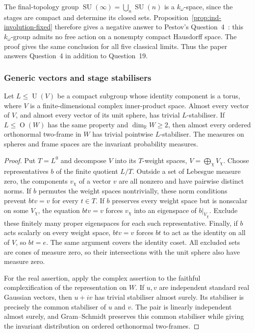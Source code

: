 \begin{remark}\label{rem:ind-pestov-question-four}
The final-topology group $\operatorname{SU}(\infty)=\bigcup_n\operatorname{SU}(n)$ is a
$k_\omega$-space, since the stages are compact and determine its closed
sets. Proposition~\ref{prop:ind-involution-fixed} therefore gives a negative
answer to Pestov's Question~4~\cite[p.~440]{Pestov2007}: this
$k_\omega$-group admits no free action on a nonempty compact Hausdorff
space. The proof gives the same conclusion for all five classical
limits. Thus the paper answers Question~4 in addition to Question~19.
\end{remark}


\subsubsection{Generic vectors and stage stabilisers}

\begin{lemma}\label{lem:ind-generic-free-vectors}
Let $L\le\operatorname{U}(V)$ be a compact subgroup whose identity component is
a torus, where $V$ is a finite-dimensional complex inner-product
space. Almost every vector of $V$, and almost every vector of its
unit sphere, has trivial $L$-stabiliser. If $L\le\operatorname{O}(W)$ has the
same property and $\dim_{\mathbb R}W\ge2$, then almost every ordered
orthonormal two-frame in $W$ has trivial pointwise $L$-stabiliser.
The measures on spheres and frame spaces are the invariant
probability measures.
\end{lemma}

\begin{proof}
Put $T=L^0$ and decompose $V$ into its $T$-weight spaces,
$V=\bigoplus_\chi V_\chi$. Choose representatives $b$ of the
finite quotient $L/T$. Outside a set of Lebesgue measure zero,
the components $v_\chi$ of a vector $v$ are all nonzero and have
pairwise distinct norms. If $b$ permutes the weight spaces
nontrivially, these norm conditions prevent $btv=v$ for every
$t\in T$. If $b$ preserves every weight space but is nonscalar
on some $V_\chi$, the equation $btv=v$ forces $v_\chi$ into an
eigenspace of $b|_{V_\chi}$. Exclude these finitely many proper
eigenspaces for each such representative. Finally, if $b$ acts
scalarly on every weight space, $btv=v$ forces $bt$ to act as the
identity on all of $V$, so $bt=e$. The same argument covers the
identity coset. All excluded sets are cones of measure zero, so
their intersections with the unit sphere also have measure zero.

For the real assertion, apply the complex assertion to the faithful
complexification of the representation on $W$. If $u,v$ are
independent standard real Gaussian vectors, then $u+iv$ has trivial
stabiliser almost surely. Its stabiliser is precisely the common
stabiliser of $u$ and $v$. The pair is linearly independent almost
surely, and Gram--Schmidt preserves this common stabiliser while
giving the invariant distribution on ordered orthonormal
two-frames.
\end{proof}

